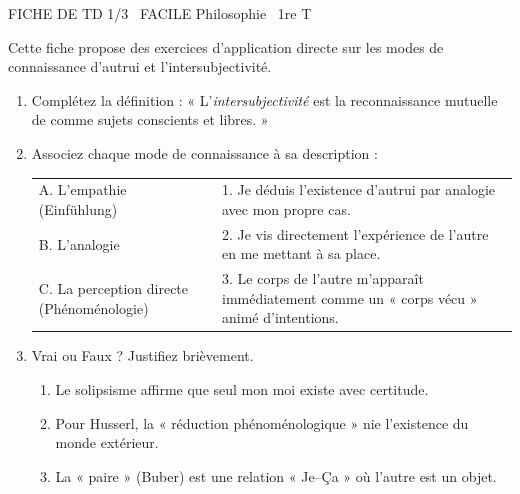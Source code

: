 \documentclass[11pt]{article}
\begin{document}
\begin{tcolorbox}[enhanced,colback=popink,colframe=popink,arc=10pt,boxrule=0pt,left=12pt,right=12pt,top=9pt,bottom=9pt]
{\color{white}\popxbold\small FICHE DE TD 1/3 \textbullet\ FACILE \hfill Philosophie \textbullet\ 1re T\par}
\end{tcolorbox}
\vspace{4pt}
Cette fiche propose des exercices d'application directe sur les modes de connaissance d'autrui et l'intersubjectivité.

\begin{exercice}
\begin{enumerate}
    \item Complétez la définition : « L'\textit{intersubjectivité} est la reconnaissance mutuelle de \underline{\hspace{5cm}} comme sujets conscients et libres. »
    \item Associez chaque mode de connaissance à sa description :
    \begin{tabular}{ll}
    A. L'empathie (Einfühlung) & 1. Je déduis l'existence d'autrui par analogie avec mon propre cas. \\
    B. L'analogie & 2. Je vis directement l'expérience de l'autre en me mettant à sa place. \\
    C. La perception directe (Phénoménologie) & 3. Le corps de l'autre m'apparaît immédiatement comme un « corps vécu » animé d'intentions.
    \end{tabular}
    \item Vrai ou Faux ? Justifiez brièvement.
    \begin{enumerate}
        \item Le solipsisme affirme que seul mon moi existe avec certitude.
        \item Pour Husserl, la « réduction phénoménologique » nie l'existence du monde extérieur.
        \item La « paire » (Buber) est une relation « Je–Ça » où l'autre est un objet.
    \end{enumerate}
\end{enumerate}
\end{exercice}
\end{document}
